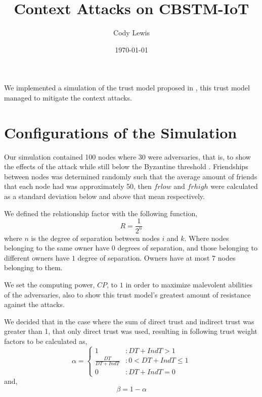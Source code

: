 \documentclass{article}
\title{Context Attacks on CBSTM-IoT}
\author{Cody Lewis}
\date{\today}
\begin{document}
    \maketitle

    We implemented a simulation of the trust model proposed in \cite{rafey2016cbstm},
    this trust model managed to mitigate the context attacks.

    \section{Configurations of the Simulation}
    Our simulation contained 100 nodes where 30 were adversaries, that is, to
    show the effects of the attack while still below the Byzantine threshold
    \cite{lamport2019byzantine}. Friendships between nodes was determined
    randomly such that the average amount of friends that each node had was
    approximately 50, then $frlow$ and $frhigh$ were calculated as a standard
    deviation below and above that mean respectively.

    We defined the relationship factor with the following function,
    \begin{equation}
        R = \frac{1}{2^n}
    \end{equation}
    where $n$ is the degree of separation between nodes $i$ and $k$. Where
    nodes belonging to the same owner have $0$ degrees of separation, and
    those belonging to different owners have $1$ degree of separation.
    Owners have at most 7 nodes belonging to them.

    We set the computing power, $CP$, to $1$ in order to maximize malevolent abilities of
    the adversaries, also to show this trust model's greatest amount of resistance
    against the attacks.

    We decided that in the case where the sum of direct trust and indirect trust was greater
    than 1, that only direct trust was used, resulting in following trust weight factors
    to be calculated as,
    \begin{equation}
        \alpha = \begin{cases}
            1 & : DT + IndT > 1 \\
            \frac{DT}{DT + IndT} & : 0 < DT + IndT \leq 1 \\
            0 & : DT + IndT = 0
        \end{cases}
    \end{equation}
    and,
    \begin{equation}
        \beta = 1 - \alpha
    \end{equation}
\end{document}
